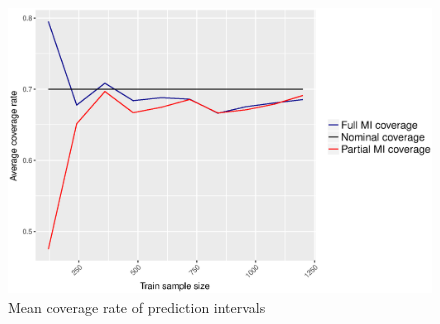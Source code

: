 \begin{figure}[h]
	\centering
   \includegraphics[scale=0.6]{Resources/interval_coverage}
   \caption{Mean coverage rate of prediction intervals}
   \label{fig.interval_coverage}
\end{figure}
